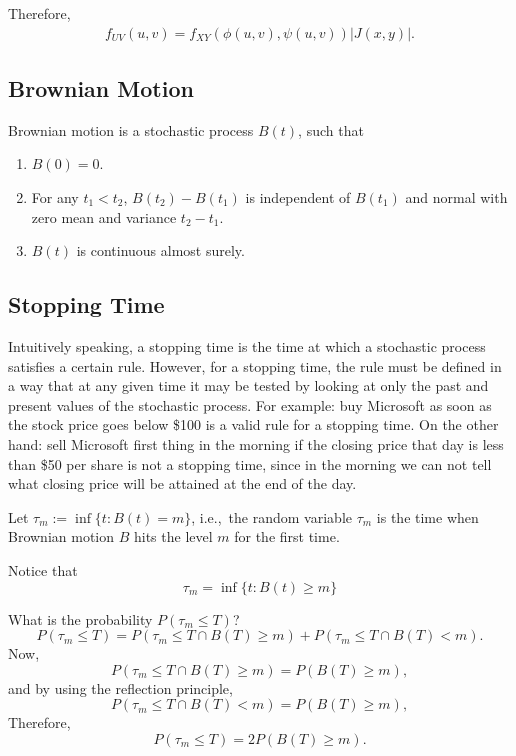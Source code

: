 \documentclass{amsart}
\theoremstyle{plain}
\numberwithin{equation}{section}
\begin{document}
Therefore,
\begin{align*}
f_{UV}(u, v) = f_{XY}(\phi(u,v), \psi(u,v)) \left|J(x, y)\right|.
\end{align*}


\subsection*{Brownian Motion}
Brownian motion is a stochastic 
process $B(t)$, such that 
\begin{enumerate}
\item $B(0)=0$.
\item For any $t_1 < t_2$, $B(t_2)-B(t_1)$ is 
independent of $B(t_1)$ and normal with zero mean and 
variance $t_2-t_1$. 
\item $B(t)$ is continuous almost surely.
\end{enumerate}

\subsection*{Stopping Time}
Intuitively speaking, a stopping time 
is the time at which 
a stochastic process satisfies a 
certain rule. However, for a stopping time, the 
rule must be defined in a way that at any given time
it may be tested by looking at
only the past and present values of the 
stochastic process. 
For example: buy Microsoft as 
soon as the stock price goes below \$100 is a valid
rule for a stopping time. On the other hand: sell 
Microsoft first thing in the morning if the closing price
that day is less than \$50 per share
is not a stopping time, since in the morning we can not 
tell what closing price will be attained at the end of 
the day. 

Let $\tau_m := \inf \{ t: B(t) = m \}$, i.e.,\
the random variable $\tau_m$ is the time
when Brownian motion $B$ hits the 
level $m$ for the first time.

Notice that 
\begin{equation}
\tau_m = \inf \{t: B(t) \geq m\}
\end{equation}

What is the probability $P(\tau_m \leq T)$?
\begin{equation*}
P(\tau_m \leq T) = 
P(\tau_m \leq T \cap B(T) \geq m ) + 
P(\tau_m \leq T \cap B(T) < m ).
\end{equation*}
Now,
\begin{equation}
P(\tau_m \leq T \cap B(T) \geq m ) = P( B(T) \geq m ), 
\end{equation}
and by using the reflection principle,
\begin{equation}
P(\tau_m \leq T \cap B(T) < m ) = P( B(T) \geq m ), 
\end{equation}
Therefore,
\begin{equation}
P(\tau_m \leq T) = 2 P(B(T) \geq m ).
\end{equation}
\end{document}
